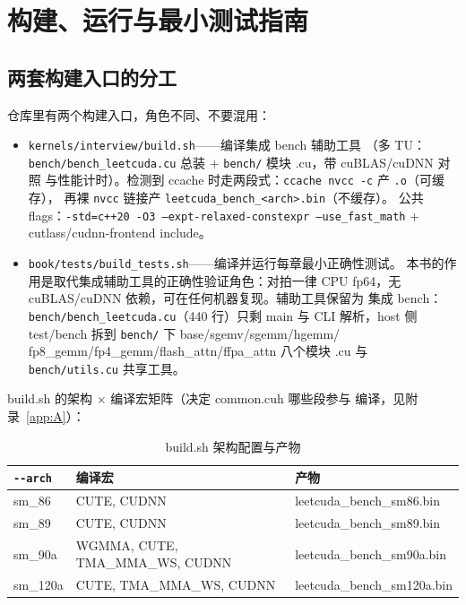 \chapter{构建、运行与最小测试指南}\label{app:C}

\section{两套构建入口的分工}

仓库里有两个构建入口，角色不同、不要混用：

\begin{itemize}
  \item \texttt{kernels/\allowbreak{}interview/\allowbreak{}build.\allowbreak{}sh}——编译集成 bench 辅助工具
        （多 TU：\texttt{bench/bench\_leetcuda.cu} 总装 $+$ \texttt{bench/} 模块 .cu，带 cuBLAS/cuDNN 对照
        与性能计时）。检测到
        ccache 时走两段式：\texttt{ccache nvcc -c} 产 \texttt{.o}（可缓存），
        再裸 \texttt{nvcc} 链接产 \texttt{leetcuda\_\allowbreak{}bench\_\allowbreak{}<arch>.\allowbreak{}bin}（不缓存）。
        公共 flags：\texttt{-std=\allowbreak{}c++20 -O3 --expt-relaxed-constexpr
        --use\_\allowbreak{}fast\_\allowbreak{}math} + cutlass/cudnn-frontend include。
  \item \texttt{book/\allowbreak{}tests/\allowbreak{}build\_\allowbreak{}tests.\allowbreak{}sh}——编译并运行每章最小正确性测试。
        本书的作用是取代集成辅助工具的正确性验证角色：对拍一律
        CPU fp64，无 cuBLAS/cuDNN 依赖，可在任何机器复现。辅助工具保留为
        集成 bench：\texttt{bench/bench\_leetcuda.cu}（440 行）只剩 main 与
        CLI 解析，host 侧 test/bench 拆到 \texttt{bench/} 下 base/sgemv/sgemm/hgemm/
        fp8\_gemm/fp4\_gemm/flash\_attn/ffpa\_attn 八个模块 .cu 与
        \texttt{bench/utils.cu} 共享工具。
\end{itemize}

\noindent build.sh 的架构 $\times$ 编译宏矩阵（决定 common.cuh 哪些段参与
编译，见附录~\ref{app:A}）：

\begin{table}[htbp]
\centering\small
\caption{build.sh 架构配置与产物}\label{tab:appC-archdef}
\begin{tabular}{lll}
\toprule
\texttt{-{}-arch} & 编译宏 & 产物 \\
\midrule
sm\_86 & CUTE, CUDNN & leetcuda\_bench\_sm86.bin \\
sm\_89 & CUTE, CUDNN & leetcuda\_bench\_sm89.bin \\
sm\_90a & WGMMA, CUTE, TMA\_MMA\_WS, CUDNN & leetcuda\_bench\_sm90a.bin \\
sm\_120a & CUTE, TMA\_MMA\_WS, CUDNN & leetcuda\_bench\_sm120a.bin \\
\bottomrule
\end{tabular}
\end{table}


